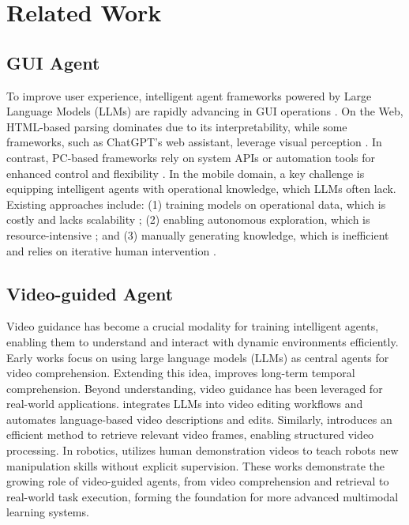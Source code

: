 \section{Related Work}
\subsection{GUI Agent}
To improve user experience, intelligent agent frameworks powered by Large Language Models (LLMs) are rapidly advancing in GUI operations \citep{wang2024gui,liu2025llm}. On the Web, HTML-based parsing dominates due to its interpretability, while some frameworks, such as ChatGPT’s web assistant, leverage visual perception \citep{zhou2023webarena,deng2023mindweb,zheng2024gpt,he2024webvoyager,lu2024weblinx,yoran2024assistantbench,reddy2024infogent}. In contrast, PC-based frameworks rely on system APIs or automation tools for enhanced control and flexibility \citep{zhang2024ufo,tan2024towards,xie2024osworld}. In the mobile domain, a key challenge is equipping intelligent agents with operational knowledge, which LLMs often lack. Existing approaches include: (1) training models on operational data, which is costly and lacks scalability \citep{hong2023cogagent,cheng2024seeclick,you2024ferret,zhang2024android,chen2024octopus,lu2024gui,chai2024amex,rawles2024androidworld,xu2024androidlab,li2024effects,wan2024omniparser,xing2024understanding,liu2024autoglm}; (2) enabling autonomous exploration, which is resource-intensive \citep{yang2023appagent,wang2024mobile,li2024appagent,wang2025mobile}; and (3) manually generating knowledge, which is inefficient and relies on iterative human intervention \citep{wang2024mobile2}.

\subsection{Video-guided Agent}
Video guidance has become a crucial modality for training intelligent agents, enabling them to understand and interact with dynamic environments efficiently. Early works focus on using large language models (LLMs) as central agents for video comprehension. Extending this idea, \citep{wang2024videoagent} improves long-term temporal comprehension. Beyond understanding, video guidance has been leveraged for real-world applications. \citep{wang2024lave} integrates LLMs into video editing workflows and automates language-based video descriptions and edits. Similarly, \citep{zhang2024omagent} introduces an efficient method to retrieve relevant video frames, enabling structured video processing. In robotics, \citep{chane2023learning} utilizes human demonstration videos to teach robots new manipulation skills without explicit supervision. These works demonstrate the growing role of video-guided agents, from video comprehension and retrieval to real-world task execution, forming the foundation for more advanced multimodal learning systems.